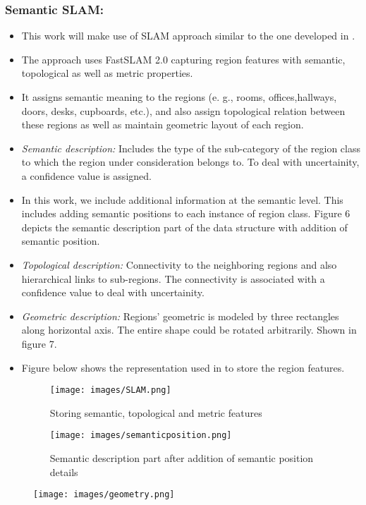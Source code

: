\subsubsection{ Semantic SLAM:}
\begin{itemize}
 \item This work will make use of SLAM approach similar to the one developed in \cite{8}.
 \item The approach uses FastSLAM 2.0 capturing region features with semantic, topological as well as metric properties.
 \item It assigns semantic meaning to the regions (e. g., rooms, offices,hallways, doors, desks, cupboards, etc.), and also assign topological relation between these regions as well as maintain 
 geometric layout of each region.
 \item \textit{Semantic description:} Includes the type of the sub-category of the region class to which the region under consideration belongs to. To deal with uncertainity, a confidence value is assigned.
 \item In this work, we include additional information at the semantic level. This includes adding semantic positions to each instance of region class. Figure 6 depicts the semantic description part of the data structure with addition of semantic position. 
 \item \textit{Topological description:} Connectivity to the neighboring regions and also hierarchical links to sub-regions. The connectivity is associated with a confidence value to deal with uncertainity.
 \item \textit{Geometric description:} Regions' geometric is modeled by three rectangles along horizontal axis. The entire shape could be rotated arbitrarily. Shown in figure 7.

 \item Figure below shows the representation used in \cite{8} to store the region features.
  \begin{figure}[htbp] %
    \centering
    \texttt{[image: images/SLAM.png]}
    \caption{Storing semantic, topological and metric features \cite{8}}
    \label{Fig:} 
  \end{figure} 
  \begin{figure}[htbp] %
    \centering
    \texttt{[image: images/semanticposition.png]}
      \caption{Semantic description part after addition of semantic position details}
    \label{Fig: Semantic description part after addition of semantic position details}
  \end{figure} 
\end{itemize}
\begin{figure}[htbp] %
   \centering
   \texttt{[image: images/geometry.png]}
   \caption{}
   \label{Fig: Method of storing geometric shape of the room}
\end{figure}
\fi